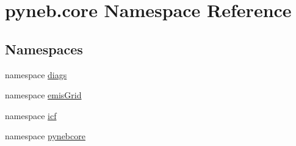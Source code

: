 \hypertarget{namespacepyneb_1_1core}{\section{pyneb.\-core Namespace Reference}
\label{namespacepyneb_1_1core}
}
\subsection*{Namespaces}
\begin{DoxyCompactItemize}
\item 
namespace \hyperlink{namespacepyneb_1_1core_1_1diags}{diags}
\item 
namespace \hyperlink{namespacepyneb_1_1core_1_1emis_grid}{emis\-Grid}
\item 
namespace \hyperlink{namespacepyneb_1_1core_1_1icf}{icf}
\item 
namespace \hyperlink{namespacepyneb_1_1core_1_1pynebcore}{pynebcore}
\end{DoxyCompactItemize}
